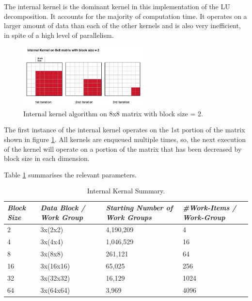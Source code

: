 \par{The internal kernel is the dominant kernel in this implementation of the LU decomposition. 
    It accounts for the majority of computation time. It operates on a larger amount of data 
    than each of the other kernels and is also very inefficient, in spite of a high level of parallelism.}

\begin{figure}[!h]
    \centering
    \includegraphics[width=0.6\textwidth]{figures/InternalKernel2.png}
    \caption{Internal kernel algorithm on 8x8 matrix with block size = 2.}
    \label{InternalKernel2}
\end{figure}

\par{The first instance of the internal kernel operates on the 1st portion of the matrix shown in figure \ref{InternalKernel2}. 
    All kernels are enqueued multiple times, so, the next execution of the kernel will operate on 
    a portion of the matrix that has been decreased by block size in each dimension.}

\par{Table \ref{tab:lu3} summarises the relevant parameters.}

\begin{table}[!h]
    \centering
    \begin{tabular}{| l | l | l | l |}
    \hline
    \emph{Block Size} & \emph{Data Block / Work Group} & \emph{Starting Number of Work Groups} & \emph{\#Work-Items / Work-Group} \\ \hline
    2 & 3x(2x2) & 4,190,209 & 4 \\ \hline
    4 & 3x(4x4) & 1,046,529 & 16 \\ \hline
    8 & 3x(8x8) & 261,121 & 64 \\ \hline
    16 & 3x(16x16) & 65,025 & 256 \\ \hline
    32 & 3x(32x32) & 16,129 & 1024 \\ \hline
    64 & 3x(64x64) & 3,969 & 4096 \\ \hline
    \end{tabular}
    \caption{Internal Kernal Summary.}
    \label{tab:lu3}
\end{table}

